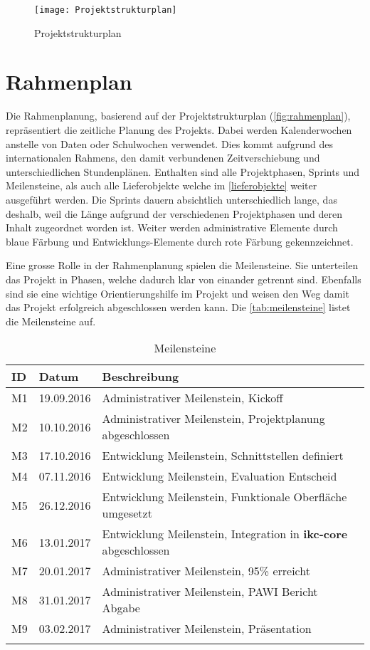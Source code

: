 \newpage

\begin{landscape}
\begin{figure}[ht]
\centering
\texttt{[image: Projektstrukturplan]}
\caption{Projektstrukturplan}
\label{fig:projektstrukturplan}
\end{figure}
\end{landscape}

\newpage

\section{Rahmenplan}
Die Rahmenplanung, basierend auf der Projektstrukturplan (\autoref{fig:rahmenplan}), repräsentiert die zeitliche Planung des Projekts. Dabei werden Kalenderwochen anstelle von Daten oder Schulwochen verwendet. Dies kommt aufgrund des internationalen Rahmens, den damit verbundenen Zeitverschiebung und unterschiedlichen Stundenplänen. Enthalten sind alle Projektphasen, Sprints und Meilensteine, als auch alle Lieferobjekte welche im \autoref{lieferobjekte} weiter ausgeführt werden. Die Sprints dauern absichtlich unterschiedlich lange, das deshalb, weil die Länge auf\-grund der verschiedenen Projektphasen und deren Inhalt zugeordnet worden ist. Weiter werden administrative Elemente durch blaue Färbung und Entwicklungs-Elemente durch rote Färbung gekennzeichnet.

Eine grosse Rolle in der Rahmenplanung spielen die Meilensteine. Sie unterteilen das Projekt in Phasen, welche dadurch klar von einander getrennt sind. Ebenfalls sind sie eine wichtige Orientierungshilfe im Projekt und weisen den Weg damit das Projekt erfolgreich abgeschlossen werden kann. Die \autoref{tab:meilensteine} listet die Meilensteine auf.


\begin{longtable}{|p{1cm}|p{2cm}|p{8.5cm}|}
  \hline
    ID & Datum &  Beschreibung \\\hline
    M1 & 19.09.2016 & Administrativer Meilenstein, Kickoff\\\hline
    M2 & 10.10.2016 & Administrativer Meilenstein, Projektplanung abgeschlossen\\\hline
    M3 & 17.10.2016 & Entwicklung Meilenstein, Schnittstellen definiert\\\hline
    M4 & 07.11.2016 & Entwicklung Meilenstein, Evaluation Entscheid\\\hline
    M5 & 26.12.2016 & Entwicklung Meilenstein, Funktionale Oberfläche umgesetzt\\\hline
    M6 & 13.01.2017 & Entwicklung Meilenstein, Integration in \textbf{ikc-core} abgeschlossen\\\hline
    M7 & 20.01.2017 & Administrativer Meilenstein, 95\% erreicht\\\hline
    M8 & 31.01.2017 & Administrativer Meilenstein, PAWI Bericht Abgabe\\\hline
    M9 & 03.02.2017 & Administrativer Meilenstein, Präsentation\\\hline
    \caption{Meilensteine}
  \label{tab:meilensteine}
\end{longtable}

